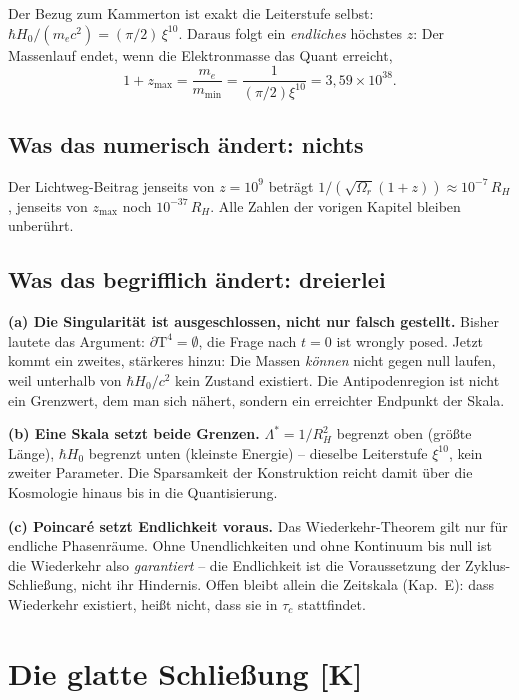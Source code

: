 Der Bezug zum Kammerton ist exakt die Leiterstufe selbst:
$\hbar H_0/(m_ec^2) = (\pi/2)\,\xi^{10}$. Daraus folgt ein
\emph{endliches} höchstes $z$: Der Massenlauf endet, wenn die
Elektronmasse das Quant erreicht,
\begin{equation}
  1+z_\text{max} = \frac{m_e}{m_\text{min}}
  = \frac{1}{(\pi/2)\xi^{10}} = 3{,}59\times10^{38}.
\end{equation}

\section{Was das numerisch ändert: nichts}

Der Lichtweg-Beitrag jenseits von $z = 10^9$ beträgt
$1/(\sqrt{\Omega_r}(1{+}z)) \approx 10^{-7}\,R_H$, jenseits von
$z_\text{max}$ noch $10^{-37}\,R_H$. Alle Zahlen der vorigen
Kapitel bleiben unberührt.

\section{Was das begrifflich ändert: dreierlei}

\textbf{(a) Die Singularität ist ausgeschlossen, nicht nur falsch
gestellt.} Bisher lautete das Argument: $\partial\text{T}^4 =
\emptyset$, die Frage nach $t=0$ ist wrongly posed. Jetzt kommt
ein zweites, stärkeres hinzu: Die Massen \emph{können} nicht
gegen null laufen, weil unterhalb von $\hbar H_0/c^2$ kein Zustand
existiert. Die Antipodenregion ist nicht ein Grenzwert, dem man
sich nähert, sondern ein erreichter Endpunkt der Skala.

\textbf{(b) Eine Skala setzt beide Grenzen.} $\Lambda^{*} =
1/R_H^2$ begrenzt oben (größte Länge), $\hbar H_0$ begrenzt unten
(kleinste Energie) -- dieselbe Leiterstufe $\xi^{10}$, kein
zweiter Parameter. Die Sparsamkeit der Konstruktion reicht damit
über die Kosmologie hinaus bis in die Quantisierung.

\textbf{(c) Poincaré setzt Endlichkeit voraus.} Das
Wiederkehr-Theorem gilt nur für endliche Phasenräume. Ohne
Unendlichkeiten und ohne Kontinuum bis null ist die
Wiederkehr also \emph{garantiert} -- die Endlichkeit ist die
Voraussetzung der Zyklus-Schließung, nicht ihr Hindernis. Offen
bleibt allein die Zeitskala (Kap.~E): dass Wiederkehr existiert,
heißt nicht, dass sie in $\tau_c$ stattfindet.

\chapter{Die glatte Schließung [K]}

